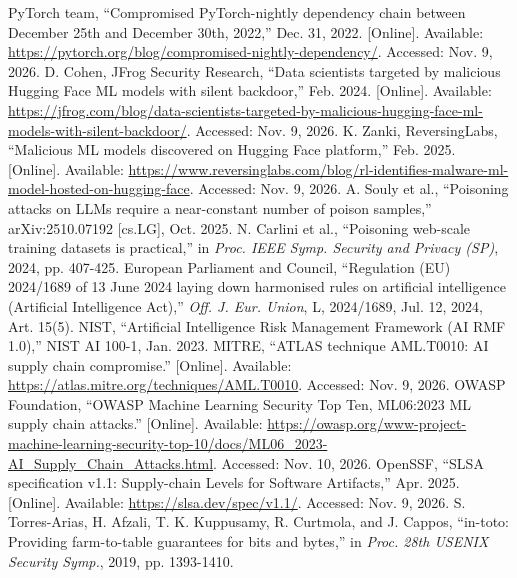 PyTorch team, ``Compromised PyTorch-nightly dependency chain between December 25th and December 30th, 2022,'' Dec. 31, 2022. [Online]. Available: \url{https://pytorch.org/blog/compromised-nightly-dependency/}. Accessed: Nov. 9, 2026.
 D. Cohen, JFrog Security Research, ``Data scientists targeted by malicious Hugging Face ML models with silent backdoor,'' Feb. 2024. [Online]. Available: \url{https://jfrog.com/blog/data-scientists-targeted-by-malicious-hugging-face-ml-models-with-silent-backdoor/}. Accessed: Nov. 9, 2026.
 K. Zanki, ReversingLabs, ``Malicious ML models discovered on Hugging Face platform,'' Feb. 2025. [Online]. Available: \url{https://www.reversinglabs.com/blog/rl-identifies-malware-ml-model-hosted-on-hugging-face}. Accessed: Nov. 9, 2026.
 A. Souly et al., ``Poisoning attacks on LLMs require a near-constant number of poison samples,'' arXiv:2510.07192 [cs.LG], Oct. 2025.
 N. Carlini et al., ``Poisoning web-scale training datasets is practical,'' in \emph{Proc. IEEE Symp. Security and Privacy (SP)}, 2024, pp. 407-425.
 European Parliament and Council, ``Regulation (EU) 2024/1689 of 13 June 2024 laying down harmonised rules on artificial intelligence (Artificial Intelligence Act),'' \emph{Off. J. Eur. Union}, L, 2024/1689, Jul. 12, 2024, Art. 15(5).
 NIST, ``Artificial Intelligence Risk Management Framework (AI RMF 1.0),'' NIST AI 100-1, Jan. 2023.
 MITRE, ``ATLAS technique AML.T0010: AI supply chain compromise.'' [Online]. Available: \url{https://atlas.mitre.org/techniques/AML.T0010}. Accessed: Nov. 9, 2026.
 OWASP Foundation, ``OWASP Machine Learning Security Top Ten, ML06:2023 ML supply chain attacks.'' [Online]. Available: \url{https://owasp.org/www-project-machine-learning-security-top-10/docs/ML06_2023-AI_Supply_Chain_Attacks.html}. Accessed: Nov. 10, 2026.
 OpenSSF, ``SLSA specification v1.1: Supply-chain Levels for Software Artifacts,'' Apr. 2025. [Online]. Available: \url{https://slsa.dev/spec/v1.1/}. Accessed: Nov. 9, 2026.
 S. Torres-Arias, H. Afzali, T. K. Kuppusamy, R. Curtmola, and J. Cappos, ``in-toto: Providing farm-to-table guarantees for bits and bytes,'' in \emph{Proc. 28th USENIX Security Symp.}, 2019, pp. 1393-1410.
